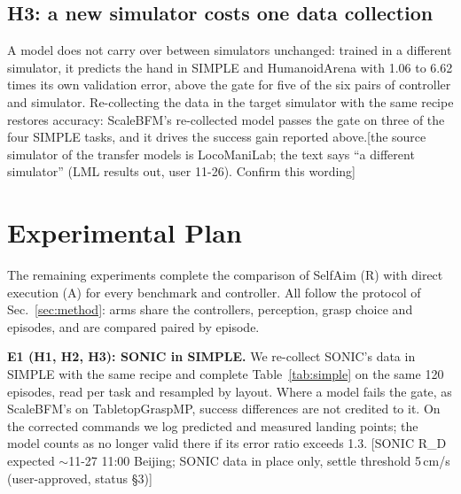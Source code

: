 \documentclass[conference]{IEEEtran}
\newif\ifdraft \drafttrue
\newcommand{\dnote}[1]{\ifdraft{\color{red}\footnotesize[#1]}\fi}
\newcommand{\Ad}{\textsc{A}}       %
\newcommand{\Rr}{\textsc{R}}       %
\begin{document}
\subsection{H3: a new simulator costs one data collection}\label{sec:h3}
A model does not carry over between simulators unchanged: trained in a different simulator, it predicts the hand in SIMPLE and HumanoidArena with 1.06 to 6.62 times its own validation error, above the gate for five of the six pairs of controller and simulator. Re-collecting the data in the target simulator with the same recipe restores accuracy: ScaleBFM's re-collected model passes the gate on three of the four SIMPLE tasks, and it drives the success gain reported above.\dnote{the source simulator of the transfer models is LocoManiLab; the text says ``a different simulator'' (LML results out, user 11-26). Confirm this wording}

\section{Experimental Plan}\label{sec:plan}
The remaining experiments complete the comparison of SelfAim (\Rr) with direct execution (\Ad) for every benchmark and controller. All follow the protocol of Sec.~\ref{sec:method}: arms share the controllers, perception, grasp choice and episodes, and are compared paired by episode.

\textbf{E1 (H1, H2, H3): SONIC in SIMPLE.} We re-collect SONIC's data in SIMPLE with the same recipe and complete Table~\ref{tab:simple} on the same 120 episodes, read per task and resampled by layout. Where a model fails the gate, as ScaleBFM's on TabletopGraspMP, success differences are not credited to it. On the corrected commands we log predicted and measured landing points; the model counts as no longer valid there if its error ratio exceeds 1.3.
\dnote{SONIC R\_D expected $\sim$11-27 11:00 Beijing; SONIC data in place only, settle threshold 5\,cm/s (user-approved, status §3)}
\end{document}
